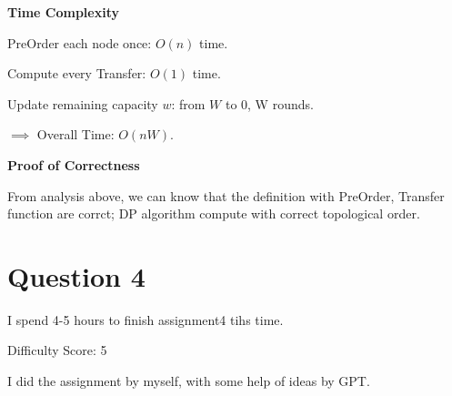 \documentclass[11pt]{article}
\begin{document}
\textbf{Time Complexity} 

\qquad PreOrder each node once: $O(n)$ time. 

\qquad Compute every Transfer: $O(1)$ time. 

\qquad Update remaining capacity $w$: from $W$ to 0, W rounds. 

\qquad $\implies$ Overall Time: $O(nW)$. 

\textbf{Proof of Correctness}

\qquad From analysis above, we can know that the definition with PreOrder, Transfer function are corrct; 
DP algorithm compute with correct topological order. 

\section*{Question 4}
I spend 4-5 hours to finish assignment4 tihs time. 

Difficulty Score: 5 

I did the assignment by myself, with some help of ideas by GPT. 
\end{document}

